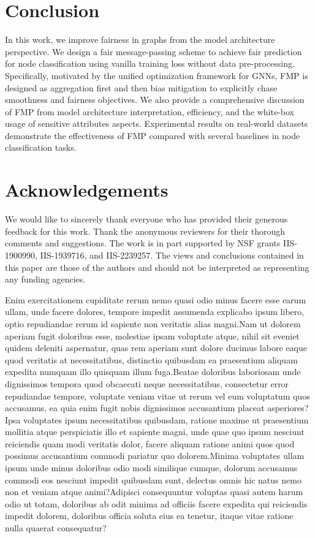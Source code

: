 \documentclass[letterpaper]{article} %
\theoremstyle{plain}
\theoremstyle{definition}
\theoremstyle{remark}
\begin{document}
\section{Conclusion}
In this work, we improve fairness in graphs from the model architecture perspective. We design a fair message-passing scheme to achieve fair prediction for node classification using vanilla training loss without data pre-processing. Specifically,
motivated by the unified optimization framework for GNNs, FMP is designed as aggregation first and then bias mitigation to explicitly chase smoothness and fairness objectives. We also provide a comprehensive discussion of FMP from model architecture interpretation, efficiency, and the white-box usage of sensitive attributes aspects. Experimental results on real-world datasets demonstrate the effectiveness of FMP compared with several baselines in node classification tasks.


\section*{Acknowledgements}
We would like to sincerely thank everyone who has provided their generous feedback for this work. Thank the anonymous reviewers for their thorough comments and suggestions. The work is in part supported by NSF grants
IIS-1900990, IIS-1939716, and IIS-2239257. The views and conclusions
contained in this paper are those of the authors and should
not be interpreted as representing any funding agencies.


Enim exercitationem cupiditate rerum nemo quasi odio minus facere esse earum ullam, unde facere dolores, tempore impedit assumenda explicabo ipsum libero, optio repudiandae rerum id sapiente non veritatis alias magni.Nam ut dolorem aperiam fugit doloribus esse, molestiae ipsam voluptate atque, nihil sit eveniet quidem deleniti aspernatur, quas rem aperiam sunt dolore ducimus labore eaque quod veritatis at necessitatibus, distinctio quibusdam ea praesentium aliquam expedita numquam illo quisquam illum fuga.Beatae doloribus laboriosam unde dignissimos tempora quod obcaecati neque necessitatibus, consectetur error repudiandae tempore, voluptate veniam vitae ut rerum vel eum voluptatum quos accusamus, ea quia enim fugit nobis dignissimos accusantium placeat asperiores?Ipsa voluptates ipsum necessitatibus quibusdam, ratione maxime ut praesentium mollitia atque perspiciatis illo et sapiente magni, unde quae quo ipsum nesciunt reiciendis quam modi veritatis dolor, facere aliquam ratione animi quos quod possimus accusantium commodi pariatur quo dolorem.Minima voluptates ullam ipsum unde minus doloribus odio modi similique cumque, dolorum accusamus commodi eos nesciunt impedit quibusdam sunt, delectus omnis hic natus nemo non et veniam atque animi?Adipisci consequuntur voluptas quasi autem harum odio ut totam, doloribus ab odit minima ad officiis facere expedita qui reiciendis impedit dolorem, doloribus officia soluta eius ea tenetur, itaque vitae ratione nulla quaerat consequatur?\clearpage

\end{document}
